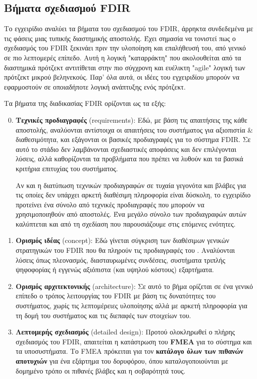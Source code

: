\documentclass[a4paper,nobib]{tufte-book}
\begin{document}
\subsection{Βήματα σχεδιασμού \acs{FDIR}}
Το εγχειρίδιο αναλύει τα βήματα του σχεδιασμού του \acs{FDIR}, άρρηκτα συνδεδεμένα με τις φάσεις μιας τυπικής διαστημικής αποστολής. Έχει σημασία να τονιστεί πως ο σχεδιασμός του \acs{FDIR} ξεκινάει πριν την υλοποίηση και επαλήθευσή του, από γενικό σε πιο λεπτομερές επίπεδο. Αυτή η λογική "καταρράκτη" που ακολουθείται από τα διαστημικά πρότζεκτ αντιτίθεται στην πιο σύγχρονη και ευέλικτη "agile" λογική των πρότζεκτ μικρού βεληνεκούς. Παρ' όλα αυτά, οι ιδέες του εγχειριδίου μπορούν να εφαρμοστούν σε οποιαδήποτε λογική ανάπτυξης ενός πρότζεκτ.

Τα βήματα της διαδικασίας \acs{FDIR} ορίζονται ως τα εξής:
\begin{enumerate}
	\setcounter{enumi}{-1}
	\item \textbf{Τεχνικές προδιαγραφές} (requirements): Εδώ, με βάση τις απαιτήσεις της κάθε αποστολής, αναλύονται αντίστοιχα οι απαιτήσεις του συστήματος για αξιοπιστία \& διαθεσιμότητα, και εξάγονται οι βασικές προδιαγραφές για το σύστημα \acs{FDIR}. Σε αυτό το στάδιο δεν λαμβάνονται σχεδιαστικές αποφάσεις και δεν επιλέγονται λύσεις, αλλά καθορίζονται τα προβλήματα που πρέπει να λυθούν και τα βασικά κριτήρια επιτυχίας του συστήματος.
	\label{itm:fdir_reqs}
	
	Αν και η διατύπωση τεχνικών προδιαγραφών σε τυχαία γεγονότα και βλάβες για τις οποίες δεν υπάρχει αρκετή διαθέσιμη πληροφορία είναι δύσκολη, το εγχειρίδιο προτείνει ένα σύνολο από τεχνικές προδιαγραφές \parencite[42]{SAVOIR-HB-003} που μπορούν να χρησιμοποιηθούν από αποστολές. Ένα μεγάλο σύνολο των προδιαγραφών αυτών καλύπτεται και από τη σχεδίαση που παρουσιάζουμε στις επόμενες ενότητες.
	\item \textbf{Ορισμός ιδέας} (concept): Εδώ γίνεται σύγκριση των διαθέσιμων γενικών στρατηγικών του \acs{FDIR} που θα πληρούν τις προδιαγραφές του . Αναλύονται λύσεις όπως πλεονασμός, διασταυρωμένες συνδέσεις, συστήματα τριπλής ψηφοφορίας ή εγγενώς αξιόπιστα (και υψηλού κόστους) εξαρτήματα.
	\label{itm:fdir_concept}
	\item \textbf{Ορισμός αρχιτεκτονικής} (architecture): Σε αυτό το βήμα ορίζεται σε ένα γενικό επίπεδο ο τρόπος λειτουργίας του \acs{FDIR} με βάση τις δυνατότητες του συστήματος, χωρίς τις λεπτομέρειες υλοποίησης αλλά με αρκετή πληροφορία για τη δομή του συστήματος και τις διεπαφές των στοιχείων του.
	\item \textbf{Λεπτομερής σχεδιασμός} (detailed design): Προτού ολοκληρωθεί ο πλήρης σχεδιασμός του \acs{FDIR}, απαιτείται η κατάστρωση του \textbf{\acf{FMEA}} \autocite{carlson_effective_fmeas_2012} για το σύστημα και τα υποσυστήματα. Το \acs{FMEA} πρόκειται για τον \textbf{κατάλογο όλων των πιθανών αποτυχιών} για ένα εξάρτημα του δορυφόρου, όπου καταλογοποιούνται με δομημένο τρόπο οι πιθανές βλάβες και η σοβαρότητά τους.
	

\end{enumerate}
\end{document}
